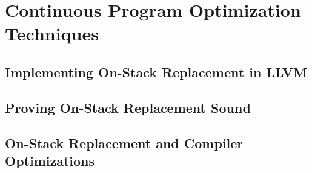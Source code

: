 \chapter{Continuous Program Optimization Techniques}
\label{ch:continuous}

\section{Implementing On-Stack Replacement in LLVM}

\section{Proving On-Stack Replacement Sound}

\section{On-Stack Replacement and Compiler Optimizations}